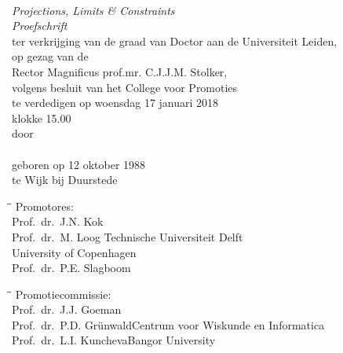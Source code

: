 \makeatletter
\thispagestyle{empty}
\begin{center}
\vspace*{2cm}
\upshape \LARGE \sffamily 
\MakeTextUppercase{\@title} \\ 
\vspace{0.2cm}
\rmfamily \large \textit{\LARGE Projections, Limits \& Constraints}\\ 
\vspace{1.0cm}
\rmfamily \large \textit{\LARGE Proefschrift}\\  
\vspace{1.0cm}
\mdseries
ter verkrijging van de graad van Doctor aan de Universiteit Leiden, \\  
op gezag van de\\  
Rector Magnificus prof.mr. C.J.J.M. Stolker,\\ 
volgens besluit van het College voor Promoties\\
te verdedigen op woensdag 17 januari 2018\\  
klokke 15.00\\ 
\vspace{0.5cm}
door\\ 
\vspace{1cm}
\textit{\LARGE \@author}\\ 
\vspace{1cm}
\mdseries
geboren op 12 oktober 1988\\
te Wijk bij Duurstede\\
\end{center}
\newpage


\thispagestyle{empty}


\begin{tabbing}
\hspace*{1.5cm}\=\hspace*{6cm}\= \kill
Promotores:\\
\vspace{0.8mm}
\>Prof.~dr.~J.N. Kok\>\\%
\>Prof.~dr.~M. Loog \> Technische Universiteit Delft\\
\>\>University of Copenhagen\\
\>Prof.~dr.~P.E. Slagboom\>%
\end{tabbing}

\begin{tabbing}
\hspace*{1.5cm}\=\hspace*{6cm}\= \kill
Promotiecommissie:\\
\vspace{0.8mm}
\>Prof.~dr.~J.J. Goeman\>\\%
\>Prof.~dr.~P.D. Gr\"{u}nwald\>Centrum voor Wiskunde en Informatica\\
\>Prof.~dr.~L.I. Kuncheva\>Bangor University\\
\end{tabbing}


